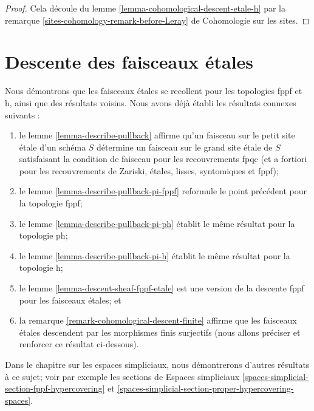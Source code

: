 \begin{proof}
Cela découle du lemme \ref{lemma-cohomological-descent-etale-h}
par la remarque \ref{sites-cohomology-remark-before-Leray} de Cohomologie sur les sites.
\end{proof}











\section{Descente des faisceaux étales}
\label{section-glueing-etale}

\noindent
Nous démontrons que les faisceaux étales se recollent pour les topologies
fppf et h, ainsi que des résultats voisins. Nous avons déjà établi les
résultats connexes suivants :
\begin{enumerate}
\item le lemme \ref{lemma-describe-pullback} affirme qu'un faisceau
sur le petit site étale d'un schéma $S$ détermine un faisceau sur le
grand site étale de $S$ satisfaisant la condition de faisceau pour les
recouvrements fpqc (et a fortiori pour les recouvrements de Zariski, étales,
lisses, syntomiques et fppf);
\item le lemme \ref{lemma-describe-pullback-pi-fppf} reformule
le point précédent pour la topologie fppf;
\item le lemme \ref{lemma-describe-pullback-pi-ph} établit le même résultat pour la
topologie ph;
\item le lemme \ref{lemma-describe-pullback-pi-h} établit le même résultat pour la
topologie h;
\item le lemme \ref{lemma-descent-sheaf-fppf-etale} est une version de la
descente fppf pour les faisceaux étales; et
\item la remarque \ref{remark-cohomological-descent-finite} affirme que
les faisceaux étales descendent par les morphismes finis surjectifs
(nous allons préciser et renforcer ce résultat ci-dessous).
\end{enumerate}
Dans le chapitre sur les espaces simpliciaux, nous démontrerons d'autres
résultats à ce sujet; voir par exemple les sections de Espaces simpliciaux
\ref{spaces-simplicial-section-fppf-hypercovering}
et \ref{spaces-simplicial-section-proper-hypercovering-spaces}.

